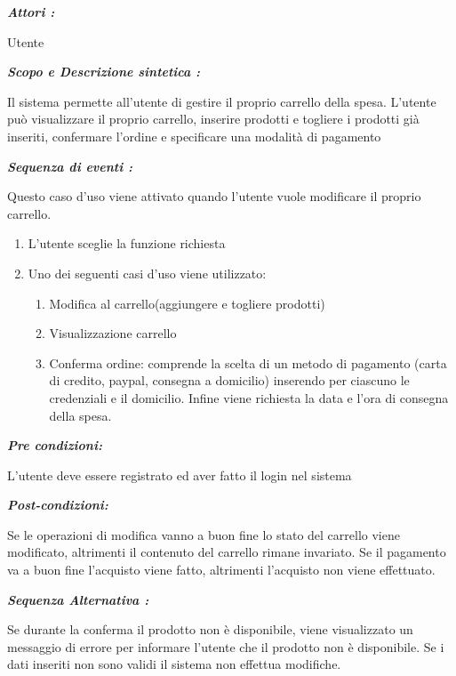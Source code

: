 \documentclass{article}
\begin{document}
\newpage
\begin{mdframed}

	\noindent\textit{\textbf{Attori :}}


	Utente

	\noindent\textit{\textbf{Scopo e Descrizione sintetica :}}


	Il sistema permette all’utente di gestire il proprio carrello della spesa.
	L’utente può visualizzare il proprio carrello,
	inserire prodotti e togliere i prodotti già inseriti, confermare l’ordine e
	specificare una modalità di pagamento

	\noindent\textit{\textbf{Sequenza di eventi :}}


	\hspace{\parindent} Questo caso d’uso viene attivato quando l’utente vuole modificare il proprio carrello.
	\begin{enumerate}
		\item L’utente sceglie la funzione richiesta
		\item Uno dei seguenti casi d’uso viene utilizzato:
		      \begin{enumerate}
			      \item Modifica al carrello(aggiungere e togliere prodotti)
			      \item Visualizzazione carrello
			      \item Conferma ordine:
			            comprende la scelta di un metodo di pagamento
			            (carta di credito, paypal, consegna a domicilio)
			            inserendo per ciascuno le credenziali e il domicilio.
			            Infine viene richiesta la data e l'ora di consegna della spesa.
		      \end{enumerate}
	\end{enumerate}

	\noindent\textit{\textbf{Pre condizioni:}}


	L’utente deve essere registrato ed aver fatto il login 	nel sistema

	\noindent\textit{\textbf{Post-condizioni:}}


	Se le operazioni di modifica vanno a buon fine lo stato del carrello viene modificato,
	altrimenti il contenuto del carrello rimane invariato.
	Se il pagamento va a buon fine l’acquisto viene fatto, altrimenti l’acquisto
	non viene effettuato.

	\noindent\textit{\textbf{Sequenza Alternativa :}}


	Se durante la conferma il prodotto non è disponibile, viene visualizzato un
	messaggio di errore per informare l’utente che il prodotto non è disponibile.
	Se i dati inseriti non sono validi il sistema non effettua modifiche.
\end{mdframed}
\newpage
\end{document}
